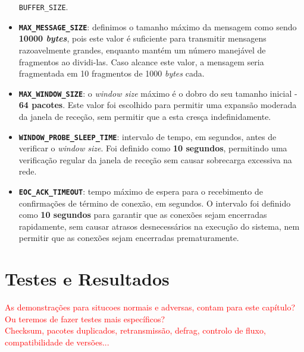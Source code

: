 \documentclass[a4paper,12pt]{scrreprt}
\begin{document}
\begin{itemize}
    \texttt{BUFFER\_SIZE}.
    \item \textbf{\texttt{MAX\_MESSAGE\_SIZE}}: definimos o tamanho máximo da mensagem como sendo \textbf{10000 \textit{bytes}},
    pois este valor é suficiente para transmitir mensagens razoavelmente grandes, enquanto mantém um número manejável de fragmentos ao dividi-las.
    Caso alcance este valor, a mensagem seria fragmentada em 10 fragmentos de 1000 \textit{bytes} cada.
    \item \textbf{\texttt{MAX\_WINDOW\_SIZE}}: o \textit{window size} máximo é o dobro do seu tamanho inicial - \textbf{64 pacotes}.
    Este valor foi escolhido para permitir uma expansão moderada da janela de receção, sem permitir que a esta cresça indefinidamente.
    \item \textbf{\texttt{WINDOW\_PROBE\_SLEEP\_TIME}}: intervalo de tempo, em segundos, antes de verificar o \textit{window size}.
    Foi definido como \textbf{10 segundos}, permitindo uma verificação regular da janela de receção sem causar sobrecarga excessiva na rede.
    \item \textbf{\texttt{EOC\_ACK\_TIMEOUT}}: tempo máximo de espera para o recebimento de confirmações de término de conexão, em segundos.
    O intervalo foi definido como \textbf{10 segundos} para garantir que as conexões sejam encerradas rapidamente, sem causar atrasos
    desnecessários na execução do sistema, nem permitir que as conexões sejam encerradas prematuramente.
\end{itemize}




\chapter{Testes e Resultados}

\textcolor{red}{
    As demonstrações para situcoes normais e adversas, contam para este capítulo?
    Ou teremos de fazer testes mais específicos? \\
    Checksum, pacotes duplicados, retransmissão, defrag, controlo de fluxo, compatibilidade de versões...
}
\end{document}
